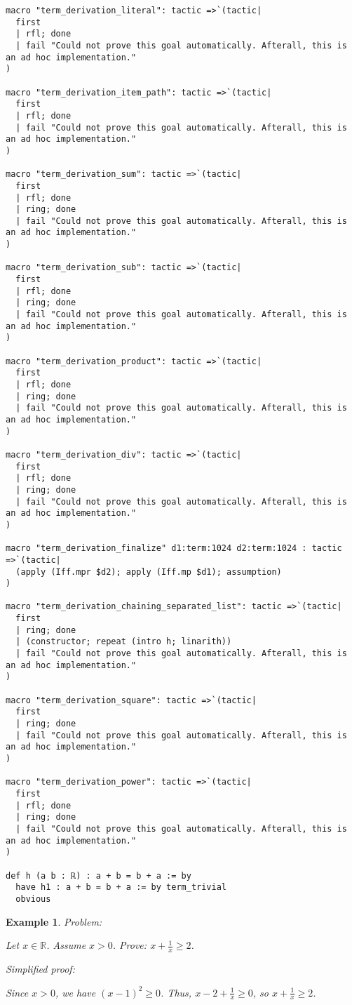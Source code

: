 \documentclass{article}
\newtheorem{example}{Example}
\begin{document}
\begin{tcolorbox}[colback=white!10, width=\linewidth]
\begin{lstlisting}[language=Lean4]
macro "term_derivation_literal": tactic =>`(tactic|
  first
  | rfl; done
  | fail "Could not prove this goal automatically. Afterall, this is an ad hoc implementation."
)

macro "term_derivation_item_path": tactic =>`(tactic|
  first
  | rfl; done
  | fail "Could not prove this goal automatically. Afterall, this is an ad hoc implementation."
)

macro "term_derivation_sum": tactic =>`(tactic|
  first
  | rfl; done
  | ring; done
  | fail "Could not prove this goal automatically. Afterall, this is an ad hoc implementation."
)

macro "term_derivation_sub": tactic =>`(tactic|
  first
  | rfl; done
  | ring; done
  | fail "Could not prove this goal automatically. Afterall, this is an ad hoc implementation."
)

macro "term_derivation_product": tactic =>`(tactic|
  first
  | rfl; done
  | ring; done
  | fail "Could not prove this goal automatically. Afterall, this is an ad hoc implementation."
)

macro "term_derivation_div": tactic =>`(tactic|
  first
  | rfl; done
  | ring; done
  | fail "Could not prove this goal automatically. Afterall, this is an ad hoc implementation."
)

macro "term_derivation_finalize" d1:term:1024 d2:term:1024 : tactic =>`(tactic|
  (apply (Iff.mpr $d2); apply (Iff.mp $d1); assumption)
)

macro "term_derivation_chaining_separated_list": tactic =>`(tactic|
  first
  | ring; done
  | (constructor; repeat (intro h; linarith))
  | fail "Could not prove this goal automatically. Afterall, this is an ad hoc implementation."
)

macro "term_derivation_square": tactic =>`(tactic|
  first
  | ring; done
  | fail "Could not prove this goal automatically. Afterall, this is an ad hoc implementation."
)

macro "term_derivation_power": tactic =>`(tactic|
  first
  | rfl; done
  | ring; done
  | fail "Could not prove this goal automatically. Afterall, this is an ad hoc implementation."
)

def h (a b : ℝ) : a + b = b + a := by
  have h1 : a + b = b + a := by term_trivial
  obvious

\end{lstlisting}
\end{tcolorbox}


\begin{example}
Problem:
\begin{tcolorbox}[colback=yellow!10, width=\linewidth]
Let $x\in\mathbb{R}$. Assume $x> 0$. Prove: $x + \frac{1}{x} \ge 2$.
\end{tcolorbox}

Simplified proof:
\begin{tcolorbox}[colback=blue!10, width=\linewidth]
Since $x>0$, we have $(x-1)^2 \ge 0$. Thus, $x - 2 + \frac{1}{x} \ge 0$, so $x + \frac{1}{x} \ge 2$.
\end{tcolorbox}
\end{example}
\end{document}
